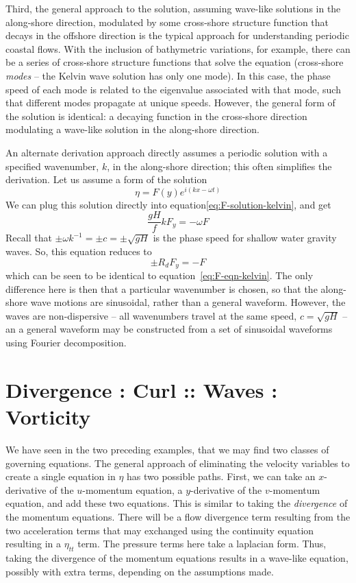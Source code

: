 \documentclass[11pt]{report}
\numberwithin{equation}{section}
\begin{document}
Third, the general approach to the solution, assuming wave-like solutions in the along-shore direction, modulated by some cross-shore structure function that decays in the offshore direction is the typical approach for understanding periodic coastal flows.  With the inclusion of bathymetric variations, for example, there can be a series of cross-shore structure functions that solve the equation (cross-shore {\it modes} -- the Kelvin wave solution has only one mode).  In this case, the phase speed of each mode is related to the eigenvalue associated with that mode, such that different modes propagate at unique speeds.  However, the general form of the solution is identical:  a decaying function in the cross-shore direction modulating a wave-like solution in the along-shore direction.

An alternate derivation approach directly assumes a periodic solution with a specified wavenumber, $k$, in the along-shore direction; this often simplifies the derivation.  Let us assume a form of the solution
\begin{equation}
    \eta = F(y) e^{i(k x - \omega t)}
\end{equation}
We can plug this solution directly into equation\ref{eq:F-solution-kelvin}, and get
\begin{equation}
    \frac{g H}{f} k F_y = -\omega F
\end{equation}
Recall that $\pm \omega k^{-1} = \pm c = \pm \sqrt{g H}$ is the phase speed for shallow water gravity waves.  So, this equation reduces to
\begin{equation}
    \pm R_d F_y = - F
\end{equation}
which can be seen to be identical to equation~\ref{eq:F-eqn-kelvin}.  The only difference here is then that a particular wavenumber is chosen, so that the along-shore wave motions are sinusoidal, rather than a general waveform.  However, the waves are non-dispersive -- all wavenumbers travel at the same speed, $c=\sqrt{g H}$ -- an a general waveform may be constructed from a set of sinusoidal waveforms using Fourier decomposition.

\section{Divergence : Curl :: Waves : Vorticity}

We have seen in the two preceding examples, that we may find two classes of governing equations.  The general approach of eliminating the velocity variables to create a single equation in $\eta$ has two possible paths.  First, we can take an $x$-derivative of the $u$-momentum equation, a $y$-derivative of the $v$-momentum equation, and add these two equations.  This is similar to taking the {\it divergence} of the momentum equations.  There will be a flow divergence term resulting from the two acceleration terms that may exchanged using the continuity equation resulting in a $\eta_{tt}$ term.  The pressure terms here take a laplacian form.  Thus, taking the divergence of the momentum equations results in a wave-like equation, possibly with extra terms, depending on the assumptions made.
\end{document}
